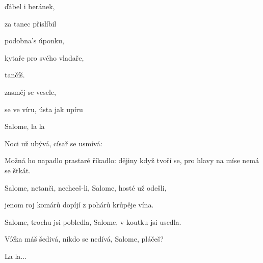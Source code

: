 

\zs
{} 

 ďábel i beránek,


 

 za tanec přislíbil

\ks

\zr
{} 

 podobna's úponku,

 kytaře pro svého vladaře,

 tančíš.

 

 zasměj se vesele,

 se ve víru, ústa jak upíru


Salome, la la       
\kr

\zs
Noci už ubývá, císař se usmívá: 

Možná ho napadlo prastaré říkadlo: dějiny když tvoří se, pro hlavy na míse nemá se štkát.
\ks

\zr
Salome, netanči, nechceš-li, Salome, hosté už odešli,

jenom roj komárů dopíjí z pohárů krůpěje vína.

Salome, trochu jsi pobledla, Salome, v koutku jsi usedla.

Víčka máš šedivá, nikdo se nedívá, Salome, pláčeš?

La la...   
\kr

\kp
